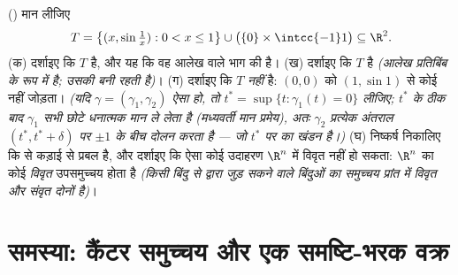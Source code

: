 \begin{exercise}[$\star\star\star$]\label{exo:b3:topology:12}
() मान लीजिए
\[
T = \bigl\{(x, \sin\tfrac1x) : 0 < x \leq 1\bigr\}
\cup \bigl(\{0\}\times\intcc{-1}1\bigr) \subseteq \R^2 .
\]
(क) दर्शाइए कि $T$  है, और यह कि वह आलेख वाले भाग की
 है।
(ख) दर्शाइए कि $T$  है \emph{(आलेख  प्रतिबिंब के रूप
में  है; उसकी   बनी रहती है)}।
(ग) दर्शाइए कि $T$  \emph{नहीं} है: $(0,0)$ को $(1, \sin1)$ से
कोई   नहीं जोड़ता। \emph{(यदि $\gamma =
(\gamma_1, \gamma_2)$ ऐसा  हो, तो $t^* = \sup\{t :
\gamma_1(t) = 0\}$
लीजिए; $t^*$ के ठीक बाद $\gamma_1$ सभी छोटे धनात्मक मान ले लेता है
(मध्यवर्ती मान प्रमेय), अतः $\gamma_2$ प्रत्येक अंतराल $(t^*, t^* + \delta)$ पर $\pm1$
के बीच दोलन करता है --- जो $t^*$ पर  का खंडन है।)}
(घ) निष्कर्ष निकालिए कि   से कड़ाई से प्रबल
है, और दर्शाइए कि ऐसा कोई उदाहरण $\R^n$ में विवृत नहीं हो सकता:
$\R^n$ का कोई \emph{विवृत}  उपसमुच्चय  होता है
\emph{(किसी  बिंदु से  द्वारा जुड़ सकने वाले बिंदुओं का
समुच्चय प्रांत में विवृत और संवृत दोनों है)}।
\end{exercise}

\section{समस्या: कैंटर समुच्चय और एक समष्टि-भरक वक्र}

